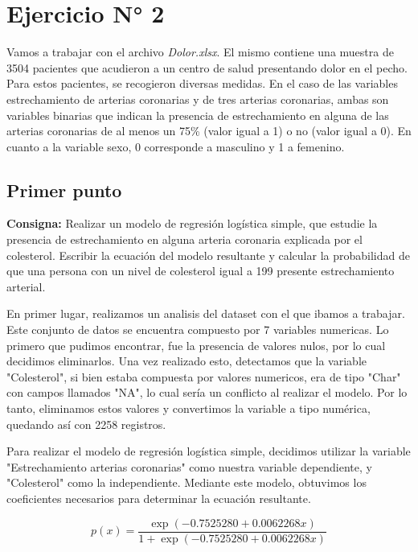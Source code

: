 \documentclass{article} %
\begin{document}
\section{Ejercicio N° 2}

Vamos a trabajar con el archivo \textit{Dolor.xlsx}. El mismo contiene una muestra de 3504 pacientes que acudieron a un centro de salud presentando dolor en el pecho. Para estos pacientes, se recogieron diversas medidas. En el caso de las variables estrechamiento de arterias coronarias y de tres arterias coronarias, ambas son variables binarias que indican la presencia de estrechamiento en alguna de las arterias coronarias de al menos un 75\% (valor igual a 1) o no (valor igual a 0). En cuanto a la variable sexo, 0 corresponde a masculino y 1 a femenino.

\subsection{Primer punto}

\textbf{Consigna:} Realizar un modelo de regresión logística simple, que estudie la presencia de estrechamiento en alguna arteria coronaria explicada por el colesterol. Escribir la ecuación del modelo resultante y calcular la probabilidad de que una persona con un nivel de colesterol igual a 199 presente estrechamiento arterial.

En primer lugar, realizamos un analisis del dataset con el que ibamos a trabajar. Este conjunto de datos se encuentra compuesto por 7 variables numericas. Lo primero que pudimos encontrar, fue la presencia de valores nulos, por lo cual decidimos eliminarlos. Una vez realizado esto, detectamos que la variable "Colesterol", si bien estaba compuesta por valores numericos, era de tipo "Char" con campos llamados "NA", lo cual sería un conflicto al realizar el modelo. Por lo tanto, eliminamos estos valores y convertimos la variable a tipo numérica, quedando así con 2258 registros. 

Para realizar el modelo de regresión logística simple, decidimos utilizar la variable "Estrechamiento arterias coronarias" como nuestra variable dependiente, y "Colesterol" como la independiente. Mediante este modelo, obtuvimos los coeficientes necesarios para determinar la ecuación resultante. 

\begin{equation}
p(x)=\frac{\exp(-0.7525280 + 0.0062268x)}{1 + \exp(-0.7525280 + 0.0062268x)}
\end{equation}
\end{document}
